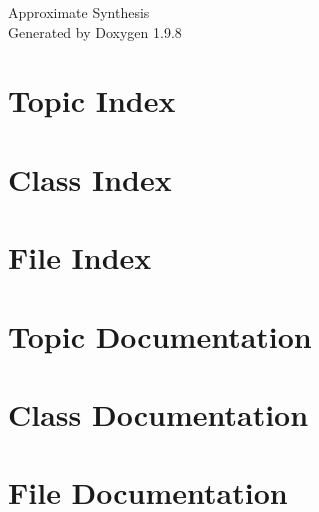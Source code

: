 \documentclass[twoside]{book}
\newcommand{\+}{\discretionary{\mbox{\scriptsize$\hookleftarrow$}}{}{}}
\newcommand{\clearemptydoublepage}{%
    \newpage{\pagestyle{empty}\cleardoublepage}%
  }
\begin{document}
  \raggedbottom
    \hypersetup{pageanchor=false,
                bookmarksnumbered=true,
                pdfencoding=unicode
               }
  \begin{titlepage}
  \vspace*{7cm}
  \begin{center}%
  {\Large Approximate Synthesis}\\
  \vspace*{1cm}
  {\large Generated by Doxygen 1.9.8}\\
  \end{center}
  \end{titlepage}
  \clearemptydoublepage
  \tableofcontents
  \clearemptydoublepage
  \hypersetup{pageanchor=true}
\chapter{Topic Index}

\chapter{Class Index}

\chapter{File Index}

\chapter{Topic Documentation}


















\chapter{Class Documentation}


\chapter{File Documentation}




  \backmatter
  \newpage
  \clearemptydoublepage
  \printindex
\end{document}
